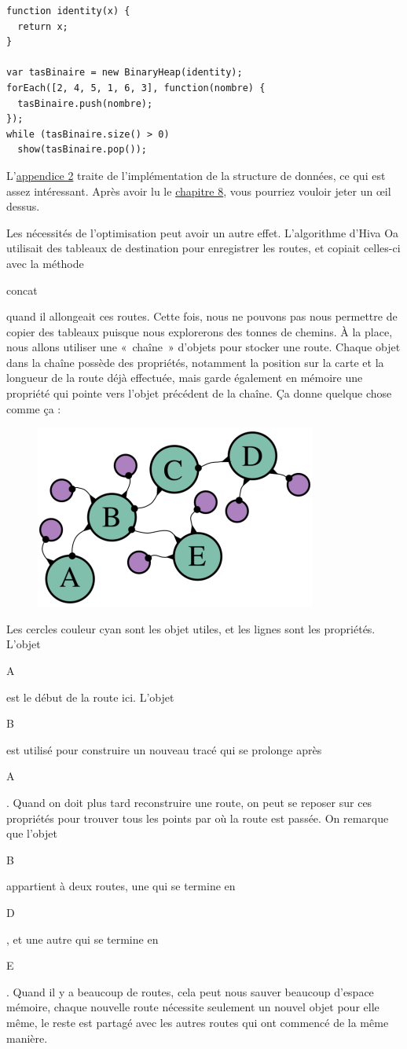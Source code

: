 \documentclass{FramateX}
\renewcommand{\texttt}[1]{\begin{sffamily}{#1}\end{sffamily}}
\begin{document}
\begin{lstlisting}
function identity(x) {
  return x;
}

var tasBinaire = new BinaryHeap(identity);
forEach([2, 4, 5, 1, 6, 3], function(nombre) {
  tasBinaire.push(nombre);
});
while (tasBinaire.size() > 0)
  show(tasBinaire.pop());
\end{lstlisting}
L'\href{appendix2.html}{appendice 2} traite de l'implémentation de la
structure de données, ce qui est assez intéressant. Après avoir lu le
\href{chapter8.html}{chapitre 8}, vous pourriez vouloir jeter un œil
dessus.

\begin{center}\end{center}

Les nécessités de l'optimisation peut avoir un autre effet. L'algorithme
d'Hiva Oa utilisait des tableaux de destination pour enregistrer les
routes, et copiait celles-ci avec la méthode \texttt{concat} quand il
allongeait ces routes. Cette fois, nous ne pouvons pas nous permettre de
copier des tableaux puisque nous explorerons des tonnes de chemins. À la
place, nous allons utiliser une «~chaîne~» d'objets pour stocker une
route. Chaque objet dans la chaîne possède des propriétés, notamment la
position sur la carte et la longueur de la route déjà effectuée, mais
garde également en mémoire une propriété qui pointe vers l'objet
précédent de la chaîne. Ça donne quelque chose comme ça :

\begin{figure}[ht!]
\centering
\includegraphics{img/objectchain.png}
\caption{}
\end{figure}

Les cercles couleur cyan sont les objet utiles, et les lignes sont les
propriétés. L'objet \texttt{A} est le début de la route ici. L'objet
\texttt{B} est utilisé pour construire un nouveau tracé qui se prolonge
après \texttt{A}. Quand on doit plus tard reconstruire une route, on
peut se reposer sur ces propriétés pour trouver tous les points par où
la route est passée. On remarque que l'objet \texttt{B} appartient à
deux routes, une qui se termine en \texttt{D}, et une autre qui se
termine en \texttt{E}. Quand il y a beaucoup de routes, cela peut nous
sauver beaucoup d'espace mémoire, chaque nouvelle route nécessite
seulement un nouvel objet pour elle même, le reste est partagé avec les
autres routes qui ont commencé de la même manière.
\end{document}
